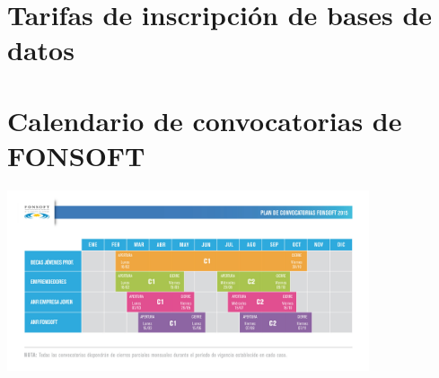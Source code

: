 \section{Tarifas de inscripción de bases de datos}
\label{anexo:tarifas-bases-de-datos}


\newpage
\section{Calendario de convocatorias de FONSOFT}
\label{anexo:calendario-fonsoft}
\includegraphics[width=0.8\textwidth]{img/tp2_capitulo3/calendario-fonsoft}

